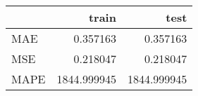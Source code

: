 \begin{tabular}{lrr}
\toprule
{} &        train &         test \\
\midrule
MAE  &     0.357163 &     0.357163 \\
MSE  &     0.218047 &     0.218047 \\
MAPE &  1844.999945 &  1844.999945 \\
\bottomrule
\end{tabular}
